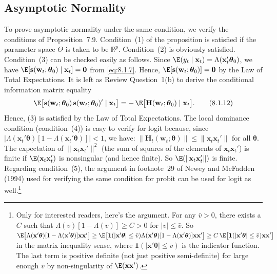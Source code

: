 \subsection*{Asymptotic Normality}

To prove asymptotic normality under the same condition, we verify the conditions
of Proposition~7.9. Condition~(1) of the proposition is satisfied if the parameter
space $\Theta$ is taken to be $\mathbb{R}^p$. Condition~(2) is obviously satisfied. Condition~(3) can be
checked easily as follows. Since $\E(y_t \mid \mathbf{x}_t) = \Lambda(\mathbf{x}_t'\boldsymbol{\theta}_0)$, we have
$\E[\mathbf{s}(\mathbf{w}_t; \boldsymbol{\theta}_0) \mid \mathbf{x}_t] = \mathbf{0}$
from \eqref{eq:8.1.7}. Hence,
$\E[\mathbf{s}(\mathbf{w}_t; \boldsymbol{\theta}_0)] = \mathbf{0}$ by the Law of Total Expectations. It is left
as Review Question~1(b) to derive the conditional information matrix equality
\begin{equation}
  \E\bigl[\mathbf{s}(\mathbf{w}_t; \boldsymbol{\theta}_0)\,
    \mathbf{s}(\mathbf{w}_t; \boldsymbol{\theta}_0)' \mid \mathbf{x}_t\bigr]
  = -\,\E\bigl[\mathbf{H}(\mathbf{w}_t; \boldsymbol{\theta}_0) \mid \mathbf{x}_t\bigr].
  \label{eq:8.1.12} \tag{8.1.12}
\end{equation}
Hence, (3) is satisfied by the Law of Total Expectations. The local dominance
condition (condition~(4)) is easy to verify for logit because, since
$|\Lambda(\mathbf{x}_t'\boldsymbol{\theta})[1 - \Lambda(\mathbf{x}_t'\boldsymbol{\theta})]| < 1$,
we have: $\|\mathbf{H}_t(\mathbf{w}_t; \boldsymbol{\theta})\| \leq \|\mathbf{x}_t\mathbf{x}_t'\|$ for all
$\boldsymbol{\theta}$. The expectation of $\|\mathbf{x}_t\mathbf{x}_t'\|^2$
(the sum of squares of the elements of $\mathbf{x}_t\mathbf{x}_t'$) is finite if
$\E(\mathbf{x}_t\mathbf{x}_t')$ is nonsingular (and hence finite).
So $\E(\|\mathbf{x}_t\mathbf{x}_t'\|)$ is finite. Regarding condition~(5), the argument in
footnote~29 of Newey and McFadden (1994) used for verifying the same condition
for probit can be used for logit as well.\footnote{Only for interested readers, here's
the argument. For any $\bar{v} > 0$, there exists a $C$ such that
$\Lambda(v)[1 - \Lambda(v)] \geq C > 0$ for $|v| \leq \bar{v}$. So
$\E\bigl[\Lambda(\mathbf{x}'\boldsymbol{\theta})[1 - \Lambda(\mathbf{x}'\boldsymbol{\theta})]\mathbf{x}\mathbf{x}'\bigr]
\geq \E\bigl[\mathbf{1}(|\mathbf{x}'\boldsymbol{\theta}| \leq \bar{v})
\Lambda(\mathbf{x}'\boldsymbol{\theta})[1 - \Lambda(\mathbf{x}'\boldsymbol{\theta})]\mathbf{x}\mathbf{x}'\bigr]
\geq C\,\E\bigl[\mathbf{1}(|\mathbf{x}'\boldsymbol{\theta}| \leq \bar{v})\mathbf{x}\mathbf{x}'\bigr]$
in the matrix inequality sense, where $\mathbf{1}(|\mathbf{x}'\boldsymbol{\theta}| \leq \bar{v})$ is the
indicator function. The last term is positive definite (not just positive semi-definite)
for large enough $\bar{v}$ by non-singularity of $\E(\mathbf{x}\mathbf{x}')$.}

